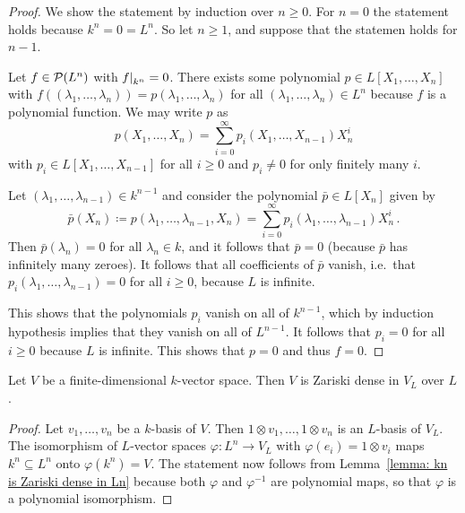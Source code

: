 \begin{proof}
  We show the statement by induction over $n \geq 0$.
  For $n = 0$ the statement holds because $k^n = 0 = L^n$.
  So let $n \geq 1$, and suppose that the statemen holds for $n-1$.
  
  Let $f \in \mathcal{P}(L^n)$ with $\restrict{f}{k^n} = 0$.
  There exists some polynomial $p \in L[X_1, \dotsc, X_n]$ with $f((\lambda_1, \dotsc, \lambda_n)) = p(\lambda_1, \dotsc, \lambda_n)$ for all $(\lambda_1, \dotsc, \lambda_n) \in L^n$ because $f$ is a polynomial function.
  We may write $p$ as
  \[
      p(X_1, \dotsc, X_n)
    = \sum_{i=0}^\infty p_i(X_1, \dotsc, X_{n-1}) X_n^i
  \]
  with $p_i \in L[X_1, \dotsc, X_{n-1}]$ for all $i \geq 0$ and $p_i \neq 0$ for only finitely many $i$.
  
  Let $(\lambda_1, \dotsc, \lambda_{n-1}) \in k^{n-1}$ and consider the polynomial $\bar{p} \in L[X_n]$ given by
  \[
              \bar{p}(X_n)
    \coloneqq p(\lambda_1, \dotsc, \lambda_{n-1}, X_n)
    =         \sum_{i=0}^\infty p_i(\lambda_1, \dotsc, \lambda_{n-1}) X_n^i \,.
  \]
  Then $\bar{p}(\lambda_n) = 0$ for all $\lambda_n \in k$, and it follows that $\bar{p} = 0$ (because $\bar{p}$ has infinitely many zeroes).
  It follows that all coefficients of $\bar{p}$ vanish, i.e.\ that $p_i(\lambda_1, \dotsc, \lambda_{n-1}) = 0$ for all $i \geq 0$, because $L$ is infinite.
  
  This shows that the polynomials $p_i$ vanish on all of $k^{n-1}$, which by induction hypothesis implies that they vanish on all of $L^{n-1}$.
  It follows that $p_i = 0$ for all $i \geq 0$ because $L$ is infinite.
  This shows that $p = 0$ and thus $f = 0$.
\end{proof}


\begin{corollary}
  \label{corollary: V is Zariski dense in VL}
  Let $V$ be a finite-dimensional $k$-vector space.
  Then $V$ is Zariski dense in $V_L$ over $L$.
\end{corollary}


\begin{proof}
  Let $v_1, \dotsc, v_n$ be a $k$-basis of $V$.
  Then $1 \otimes v_1, \dotsc, 1 \otimes v_n$ is an $L$-basis of $V_L$.
  The isomorphism of $L$-vector spaces $\varphi \colon L^n \to V_L$ with $\varphi(e_i) = 1 \otimes v_i$ maps $k^n \subseteq L^n$ onto $\varphi(k^n) = V$.
  The statement now follows from Lemma~\ref{lemma: kn is Zariski dense in Ln} because both $\varphi$ and $\varphi^{-1}$ are polynomial maps, so that $\varphi$ is a polynomial isomorphism.
\end{proof}



